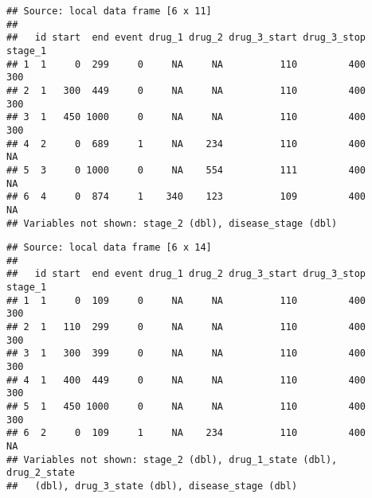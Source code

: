 \documentclass[]{article}
\newenvironment{Shaded}{\begin{snugshade}}{\end{snugshade}}
\newcommand{\KeywordTok}[1]{\textcolor[rgb]{0.13,0.29,0.53}{\textbf{{#1}}}}
\newcommand{\DataTypeTok}[1]{\textcolor[rgb]{0.13,0.29,0.53}{{#1}}}
\newcommand{\StringTok}[1]{\textcolor[rgb]{0.31,0.60,0.02}{{#1}}}
\newcommand{\NormalTok}[1]{{#1}}
\begin{document}
\begin{verbatim}
## Source: local data frame [6 x 11]
## 
##   id start  end event drug_1 drug_2 drug_3_start drug_3_stop stage_1
## 1  1     0  299     0     NA     NA          110         400     300
## 2  1   300  449     0     NA     NA          110         400     300
## 3  1   450 1000     0     NA     NA          110         400     300
## 4  2     0  689     1     NA    234          110         400      NA
## 5  3     0 1000     0     NA    554          111         400      NA
## 6  4     0  874     1    340    123          109         400      NA
## Variables not shown: stage_2 (dbl), disease_stage (dbl)
\end{verbatim}

\begin{Shaded}
\end{Shaded}

\begin{verbatim}
## Source: local data frame [6 x 14]
## 
##   id start  end event drug_1 drug_2 drug_3_start drug_3_stop stage_1
## 1  1     0  109     0     NA     NA          110         400     300
## 2  1   110  299     0     NA     NA          110         400     300
## 3  1   300  399     0     NA     NA          110         400     300
## 4  1   400  449     0     NA     NA          110         400     300
## 5  1   450 1000     0     NA     NA          110         400     300
## 6  2     0  109     1     NA    234          110         400      NA
## Variables not shown: stage_2 (dbl), drug_1_state (dbl), drug_2_state
##   (dbl), drug_3_state (dbl), disease_stage (dbl)
\end{verbatim}
\end{document}
